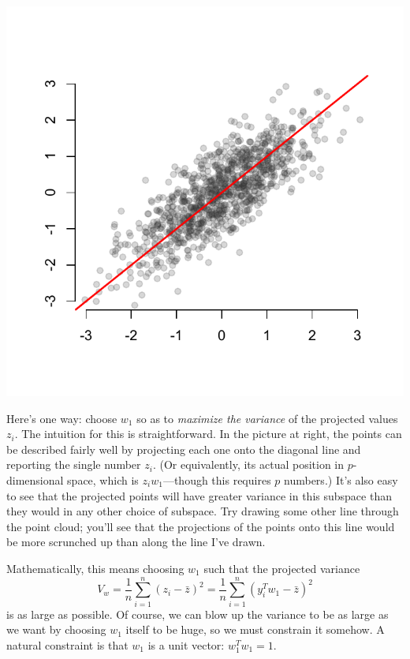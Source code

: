 \documentclass{mynotes}
\begin{document}
\begin{marginfigure}
\includegraphics{cloud1.pdf}
\end{marginfigure}

Here's one way: choose $w_1$ so as to \textit{maximize the variance} of the projected values $z_i$.  The intuition for this is straightforward.  In the picture at right, the points can be described fairly well by projecting each one onto the diagonal line and reporting the single number $z_i$.  (Or equivalently, its actual position in $p$-dimensional space, which is $z_i w_1$---though this requires $p$ numbers.)  It's also easy to see that the projected points will have greater variance in this subspace than they would in any other choice of subspace.  Try drawing some other line through the point cloud; you'll see that the projections of the points onto this line would be more scrunched up than along the line I've drawn.

Mathematically, this means choosing $w_1$ such that the projected variance
$$
V_w = \frac{1}{n} \sum_{i=1}^n (z_i - \bar{z})^2 =  \frac{1}{n} \sum_{i=1}^n (y_i^T w_1 - \bar{z})^2
$$
is as large as possible.  Of course, we can blow up the variance to be as large as we want by choosing $w_1$ itself to be huge, so we must constrain it somehow.  A natural constraint is that $w_1$ is a unit vector: $w_1^T w_1 = 1$.
\end{document}

